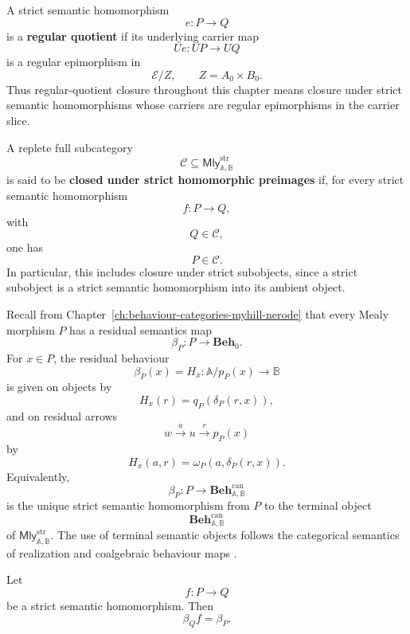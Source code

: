 \begin{definition}
\label{def:regular-quotient-strict-mealy}
    A strict semantic homomorphism
    \[
        e:P\to Q
    \]
    is a \textbf{regular quotient} if its underlying carrier map
    \[
        Ue:UP\to UQ
    \]
    is a regular epimorphism in
    \[
        \mathcal E/Z,
        \qquad
        Z=A_0\times B_0.
    \]
    Thus regular-quotient closure throughout this chapter means closure under
    strict semantic homomorphisms whose carriers are regular epimorphisms in
    the carrier slice.
\end{definition}

A replete full subcategory
\[
    \mathcal C\subseteq
    \mathsf{Mly}^{\mathrm{str}}_{\mathbb A,\mathbb B}
\]
is said to be \textbf{closed under strict homomorphic preimages} if, for every
strict semantic homomorphism
\[
    f:P\to Q,
\]
with
\[
    Q\in\mathcal C,
\]
one has
\[
    P\in\mathcal C.
\]
In particular, this includes closure under strict subobjects, since a strict
subobject is a strict semantic homomorphism into its ambient object.

Recall from Chapter~\ref{ch:behaviour-categories-myhill-nerode} that every
Mealy morphism \(P\) has a residual semantics map
\[
    \beta_P:P\to\mathbf{Beh}_0.
\]
For \(x\in P\), the residual behaviour
\[
    \beta_P(x)=H_x:\mathbb A/p_P(x)\to\mathbb B
\]
is given on objects by
\[
    H_x(r)=q_P(\delta_P(r,x)),
\]
and on residual arrows
\[
    w\xrightarrow{a}u\xrightarrow{r}p_P(x)
\]
by
\[
    H_x(a,r)=\omega_P(a,\delta_P(r,x)).
\]
Equivalently,
\[
    \beta_P:P\to\mathbf{Beh}^{\mathrm{can}}_{\mathbb A,\mathbb B}
\]
is the unique strict semantic homomorphism from \(P\) to the terminal object
\[
    \mathbf{Beh}^{\mathrm{can}}_{\mathbb A,\mathbb B}
\]
of \(\mathsf{Mly}^{\mathrm{str}}_{\mathbb A,\mathbb B}\). The use of terminal
semantic objects follows the categorical semantics of realization and
coalgebraic behaviour maps
\cite{Goguen1973,Rutten2000,Jacobs2016Coalgebra}.

\begin{lemma}
\label{lem:coeq-strict-maps-preserve-beta}
    Let
    \[
        f:P\to Q
    \]
    be a strict semantic homomorphism. Then
    \[
        \beta_Qf=\beta_P.
    \]
\end{lemma}

